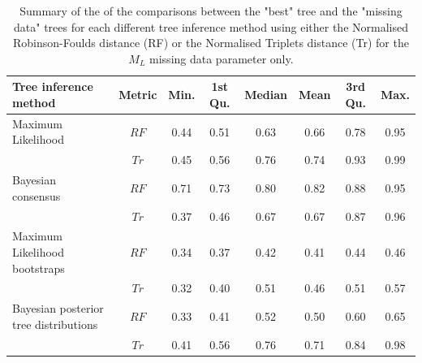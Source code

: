 \begin{landscape}
\begin{table}[ht]
\caption{Summary of the of the comparisons between the "best" tree and the "missing data" trees for each different tree inference method using either the Normalised Robinson-Foulds distance (RF) or the Normalised Triplets distance (Tr) for the $M_{L}$ missing data parameter only.}
\label{Tab_Supp_summary_metric_ML}
\centering
\begin{tabular}{lccccccc}
  \hline
 Tree inference method & Metric & Min. & 1st Qu. & Median & Mean & 3rd Qu. & Max. \\ 
  \hline
  Maximum Likelihood                    & $RF$ & 0.44 & 0.51 & 0.63 & 0.66 & 0.78 & 0.95 \\ 
                                        & $Tr$ & 0.45 & 0.56 & 0.76 & 0.74 & 0.93 & 0.99 \\ 
  Bayesian consensus                    & $RF$ & 0.71 & 0.73 & 0.80 & 0.82 & 0.88 & 0.95 \\ 
                                        & $Tr$ & 0.37 & 0.46 & 0.67 & 0.67 & 0.87 & 0.96 \\ 
  Maximum Likelihood bootstraps         & $RF$ & 0.34 & 0.37 & 0.42 & 0.41 & 0.44 & 0.46 \\ 
                                        & $Tr$ & 0.32 & 0.40 & 0.51 & 0.46 & 0.51 & 0.57 \\ 
  Bayesian posterior tree distributions & $RF$ & 0.33 & 0.41 & 0.52 & 0.50 & 0.60 & 0.65 \\ 
                                        & $Tr$ & 0.41 & 0.56 & 0.76 & 0.71 & 0.84 & 0.98 \\ 
   \hline
\end{tabular}
\end{table}
\end{landscape}


